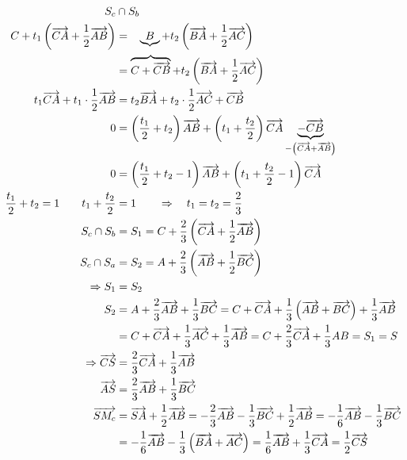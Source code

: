 \begin{mysatz}
\begin{minipage}{0.4\textwidth}
\begin{center}
\begin{tikzpicture}
            \end{tikzpicture}
        \end{center}
    \end{minipage}
    \begin{align*}
        S_c & \cap S_b\\
        C + t_1 \left( \ora{CA} + \frac{1}{2} \ora{AB} \right) & = \ \ \, \underbrace{B} + t_2 \left( \ora{BA} + \frac{1}{2} \ora{AC} \right)\\
        & = \overbrace{C + \ora{CB}} + t_2 \left( \ora{BA} + \frac{1}{2} \ora{AC} \right)\\
        t_1 \ora{CA} + t_1 \cdot \frac{1}{2} \ora{AB} & = t_2 \ora{BA} + t_2 \cdot \frac{1}{2} \ora{AC} + \ora{CB}\\
        0 & = \left( \frac{t_1}{2} + t_2 \right) \ora{AB} + \left( t_1 + \frac{t_2}{2} \right) \ora{CA} \underbrace{- \ora{CB}}_{-\left( \ora{CA} + \ora{AB} \right)}\\
        0 & = \left( \frac{t_1}{2} + t_2 - 1 \right) \ora{AB} + \left( t_1 + \frac{t_2}{2} - 1 \right) \ora{CA}\\
        \frac{t_1}{2} + t_2 = 1 \qquad t_1 + \frac{t_2}{2} & = 1 \qquad \Rightarrow \quad t_1 = t_2 = \frac{2}{3}\\
        S_c \cap S_b & = S_1 = C + \frac{2}{3} \left( \ora{CA} + \frac{1}{2} \ora{AB} \right)\\
        S_c \cap S_a & = S_2 = A + \frac{2}{3} \left( \ora{AB} + \frac{1}{2} \ora{BC} \right)\\
        \Rightarrow S_1 & = S_2\\
        S_2 & = A + \frac{2}{3} \ora{AB} + \frac{1}{3} \ora{BC} = C + \ora{CA} + \frac{1}{3} \left( \ora{AB} + \ora{BC} \right) + \frac{1}{3} \ora{AB}\\
        & = C + \ora{CA} + \frac{1}{3} \ora{AC} + \frac{1}{3} \ora{AB} = C + \frac{2}{3} \ora{CA} + \frac{1}{3} AB = S_1 = S\\
        \Rightarrow \ora{CS} & = \frac{2}{3} \ora{CA} + \frac{1}{3} \ora{AB}\\
        \ora{AS} & = \frac{2}{3} \ora{AB} + \frac{1}{3} \ora{BC}\\
        \ora{SM_c} & = \ora{SA} + \frac{1}{2} \ora{AB} = - \frac{2}{3} \ora{AB} - \frac{1}{3} \ora{BC} + \frac{1}{2} \ora{AB} = - \frac{1}{6} \ora{AB} - \frac{1}{3} \ora{BC}\\
        & = - \frac{1}{6} \ora{AB} - \frac{1}{3} \left( \ora{BA} + \ora{AC} \right) = \frac{1}{6} \ora{AB} + \frac{1}{3} \ora{CA} = \frac{1}{2} \ora{CS}
    \end{align*}
\end{mysatz}

